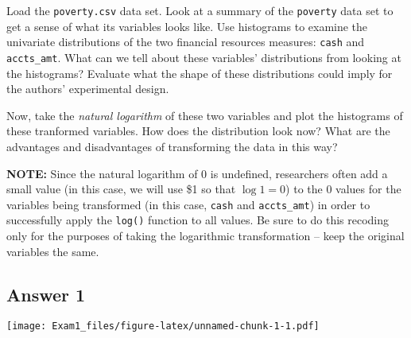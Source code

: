 \documentclass[
]{article}
\newenvironment{Shaded}{\begin{snugshade}}{\end{snugshade}}
\newcommand{\DataTypeTok}[1]{\textcolor[rgb]{0.13,0.29,0.53}{#1}}
\newcommand{\KeywordTok}[1]{\textcolor[rgb]{0.13,0.29,0.53}{\textbf{#1}}}
\newcommand{\NormalTok}[1]{#1}
\newcommand{\OperatorTok}[1]{\textcolor[rgb]{0.81,0.36,0.00}{\textbf{#1}}}
\newcommand{\OtherTok}[1]{\textcolor[rgb]{0.56,0.35,0.01}{#1}}
\newcommand{\StringTok}[1]{\textcolor[rgb]{0.31,0.60,0.02}{#1}}
\begin{document}
Load the \texttt{poverty.csv} data set. Look at a summary of the
\texttt{poverty} data set to get a sense of what its variables looks
like. Use histograms to examine the univariate distributions of the two
financial resources measures: \texttt{cash} and \texttt{accts\_amt}.
What can we tell about these variables' distributions from looking at
the histograms? Evaluate what the shape of these distributions could
imply for the authors' experimental design.

Now, take the \emph{natural logarithm} of these two variables and plot
the histograms of these tranformed variables. How does the distribution
look now? What are the advantages and disadvantages of transforming the
data in this way?

\textbf{NOTE:} Since the natural logarithm of 0 is undefined,
researchers often add a small value (in this case, we will use \$1 so
that \(\log 1 = 0\)) to the 0 values for the variables being transformed
(in this case, \texttt{cash} and \texttt{accts\_amt}) in order to
successfully apply the \texttt{log()} function to all values. Be sure to
do this recoding only for the purposes of taking the logarithmic
transformation -- keep the original variables the same.

\hypertarget{answer-1}{%
\subsection{Answer 1}\label{answer-1}}

\begin{Shaded}
\end{Shaded}

\texttt{[image: Exam1\_files/figure-latex/unnamed-chunk-1-1.pdf]}

\begin{Shaded}
\end{Shaded}
\end{document}
